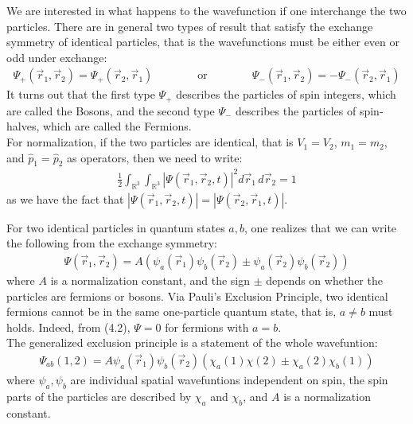 \documentclass[11pt]{book}
\theoremstyle{break}
\theoremstyle{break}
\newcommand{\R}{\mathbb{R}}
\begin{document}
We are interested in what happens to the wavefunction if one interchange the two particles. There are in general two types of result that satisfy the exchange symmetry of identical particles, that is the wavefunctions must be either even or odd under exchange:
\begin{align*}
\Psi_+(\vec{r}_1,\vec{r}_2) = \Psi_+(\vec{r}_2,\vec{r}_1) 
\qquad\qquad \text{or}\qquad\qquad  
\Psi_-(\vec{r}_1,\vec{r}_2) = -\Psi_-(\vec{r}_2,\vec{r}_1) 
\end{align*}
It turns out that the first type $\Psi_+$ describes the particles of spin integers, which are called the Bosons, and the second type $\Psi_-$ describes the particles of spin-halves, which are called the Fermions.\\ 

For normalization, if the two particles are identical, that is $V_1 = V_2$, $m_1 = m_2$, and $\hat{p}_1 = \hat{p}_2$ as operators, then we need to write:
\begin{align*}
\frac{1}{2}\int_{\R^3}\int_{\R^3} |\Psi(\vec{r}_1,\vec{r}_2,t)|^2 d\vec{r}_1\, d\vec{r}_2 = 1
\end{align*}
as we have the fact that $|\Psi(\vec{r}_1,\vec{r}_2,t)| = |\Psi(\vec{r}_2,\vec{r}_1, t)|$. 

For two identical particles in quantum states $a,b$, one realizes that we can write the following from the exchange symmetry:
\begin{align}
\Psi(\vec{r}_1,\vec{r}_2) = A\left( \psi_a(\vec{r}_1) \psi_b(\vec{r}_2) \pm \psi_a(\vec{r}_2)\psi_b(\vec{r}_2)\right) 
\end{align}
where $A$ is a normalization constant, and the sign $\pm$ depends on whether the particles are fermions or bosons. Via Pauli's Exclusion Principle, two identical fermions cannot be in the same one-particle quantum state, that is, $a\neq b$ must holds. Indeed, from (4.2), $\Psi = 0$ for fermions with $a = b$. \\

The generalized exclusion principle is a statement of the whole wavefuntion:
\begin{align*}
\Psi_{ab}(1,2) = A\psi_a(\vec{r}_1)\psi_b(\vec{r}_2)\left( \chi_a(1) \chi(2) \pm \chi_a(2) \chi_b(1) \right)
\end{align*}
where $\psi_a,\psi_b$ are individual spatial wavefuntions independent on spin, the spin parts of the particles are described by $\chi_a$ and $\chi_b$, and $A$ is a normalization constant.\\
\end{document}
